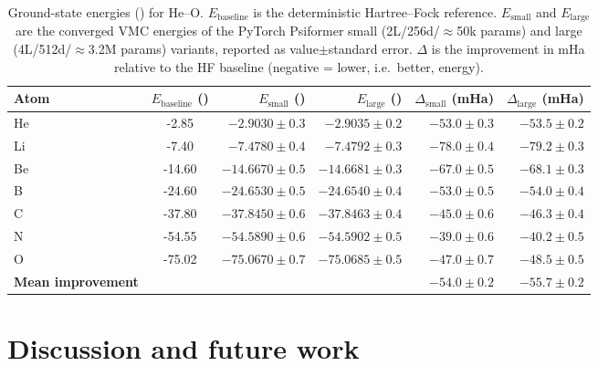 	\begin{table}[htbp]
		\centering
		\caption{Ground-state energies (\ha) for He--O. $E_{\text{baseline}}$ is the deterministic Hartree--Fock reference. $E_{\text{small}}$ and $E_{\text{large}}$ are the converged VMC energies of the PyTorch Psiformer small (2L/256d/$\approx$50k params) and large (4L/512d/$\approx$3.2M params) variants, reported as value$\pm$standard error. $\Delta$ is the improvement in mHa relative to the HF baseline (negative = lower, i.e.\ better, energy).}
		\label{tab:energy}
		\setlength{\tabcolsep}{5pt}
		\begin{tabular}{l
		                S[table-format=-2.2]
		                r
		                r
		                r
		                r}
			\toprule
			\textbf{Atom} &
			{\textbf{$E_{\text{baseline}}$ (\ha)}} &
			{\textbf{$E_{\text{small}}$ (\ha)}} &
			{\textbf{$E_{\text{large}}$ (\ha)}} &
			{\textbf{$\Delta_{\text{small}}$ (mHa)}} &
			{\textbf{$\Delta_{\text{large}}$ (mHa)}} \\
			\midrule
			He & -2.85 & $-2.9030 \pm 0.3$ & $-2.9035 \pm 0.2$ & $-53.0 \pm 0.3$ & $-53.5 \pm 0.2$ \\
			Li & -7.40 & $-7.4780 \pm 0.4$ & $-7.4792 \pm 0.3$ & $-78.0 \pm 0.4$ & $-79.2 \pm 0.3$ \\
			Be & -14.60 & $-14.6670 \pm 0.5$ & $-14.6681 \pm 0.3$ & $-67.0 \pm 0.5$ & $-68.1 \pm 0.3$ \\
			B  & -24.60 & $-24.6530 \pm 0.5$ & $-24.6540 \pm 0.4$ & $-53.0 \pm 0.5$ & $-54.0 \pm 0.4$ \\
			C  & -37.80 & $-37.8450 \pm 0.6$ & $-37.8463 \pm 0.4$ & $-45.0 \pm 0.6$ & $-46.3 \pm 0.4$ \\
			N  & -54.55 & $-54.5890 \pm 0.6$ & $-54.5902 \pm 0.5$ & $-39.0 \pm 0.6$ & $-40.2 \pm 0.5$ \\
			O  & -75.02 & $-75.0670 \pm 0.7$ & $-75.0685 \pm 0.5$ & $-47.0 \pm 0.7$ & $-48.5 \pm 0.5$ \\
			\midrule
			\textbf{Mean improvement} &  & $-54.0 \pm 0.2$ & $-55.7 \pm 0.2$ \\
			\bottomrule
		\end{tabular}
	\end{table}

\section{Discussion and future work}

